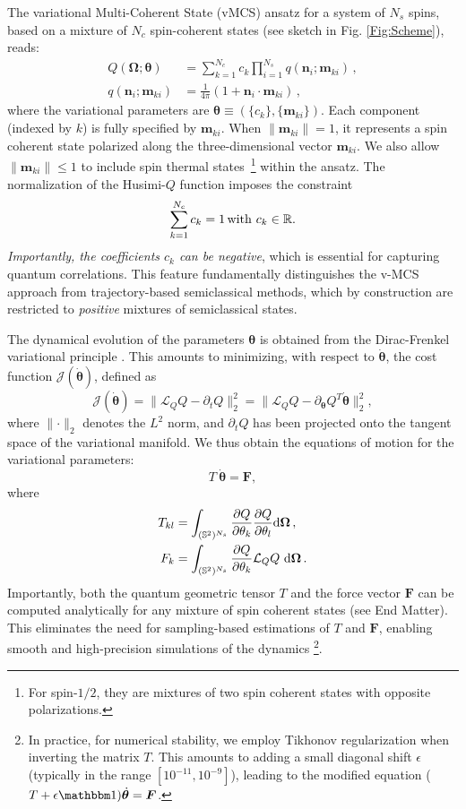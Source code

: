 \documentclass[aps,prl,twocolumn,superscriptaddress,english,floatfix]{revtex4-2}
\newcommand{\vect}[1]{\boldsymbol{#1}}
\renewcommand{\vec}[1]{\vect{#1}}
\renewcommand{\d}{{\rm {d}}}
\newcommand{\Omegavec}{\vec{\Omega}}
\newcommand{\thetavec}{{\vec{\theta}}}
\newcommand{\Fvec}{\vec{F}}
\newcommand{\mvec}{\vec{m}}
\newcommand{\nvec}{{\vec{n}}}
\newcommand{\bea}{\begin{equation}\begin{aligned}}
\newcommand{\eea}{\end{aligned}\end{equation}}
\begin{document}
The variational Multi-Coherent State (vMCS) ansatz for a system of $N_s$ spins, based on a mixture of $N_c$ spin-coherent states (see sketch in Fig. \ref{Fig:Scheme}), reads:
\bea\label{eq:vcms}
    Q(\Omegavec;\thetavec) &= \sum_{k=1}^{N_c} c_k\prod_{i = 1}^{N_s} q(\nvec_i;\mvec_{ki})\,,\\
    q(\nvec_i;\mvec_{ki})&= \frac{1}{4 \pi} (1 + {\nvec}_i \cdot {\mvec}_{ki})\,,
\eea
where the variational parameters are $\thetavec \equiv (\{c_k\}, \{\boldsymbol m_{ki}\})$. 
Each component (indexed by $k$) is fully specified by $\mvec_{ki}$. When $\lVert \mvec_{ki}\rVert = 1$, it represents a spin coherent state polarized along the three-dimensional vector $\mvec_{ki}$. We also allow $\lVert \mvec_{ki}\rVert\leq 1$ to include spin thermal states~\footnote{For spin-$1/2$, they are mixtures of two spin coherent states with opposite polarizations.} within the ansatz.
The normalization of the Husimi-$Q$ function imposes the constraint
\begin{equation}
    \sum_{k=1}^{N_c}c_k = 1 \, {\rm with} \, \, c_k \in \mathbb{R}.
\end{equation}
{\it Importantly, the coefficients $c_k$ can be negative}, which is essential for capturing quantum correlations. This feature fundamentally distinguishes the v-MCS approach from trajectory-based semiclassical methods, which by construction are restricted to \textit{positive} mixtures of semiclassical states.

The dynamical evolution of the parameters $\thetavec$ is obtained from the Dirac-Frenkel variational principle \cite{Lasser2022}. 
This amounts to minimizing, with respect to ${\dot \thetavec}$, the cost function $\mathcal J({\dot \thetavec})$, defined as
\begin{equation}
    \mathcal J(\dot \thetavec) = \lVert\mathcal L_Q Q - \partial_t Q \rVert_2^2 = \lVert\mathcal L_Q Q - \partial_\thetavec Q^T \dot \thetavec \rVert_2^2, 
\end{equation}
where $\lVert \cdot\rVert_2$ denotes the $L^2$ norm, and $\partial_t Q$ has been projected onto the tangent space of the variational manifold. We thus obtain the equations of motion for the variational parameters:
\begin{equation}
     T~{\dot \thetavec} = \Fvec,
\end{equation}
where 
\bea\label{eq:S-F}
T_{kl} &= \int_{(\mathbb{S}^2)^{N_s}} \frac{\partial Q}{\partial{\theta_k}} \frac{\partial Q}{\partial{\theta_l}} \d\Omegavec\,,\\
    F_k &= \int_{(\mathbb{S}^2)^{N_s}} \frac{\partial Q}{\partial \theta_k}  \mathcal L_Q Q ~\d\Omegavec\,. 
\eea
Importantly, both the quantum geometric tensor $T$ and the force vector $\Fvec$ can be computed analytically for any mixture of spin coherent states (see End Matter). 
This eliminates the need for sampling-based estimations of $T$ and $\Fvec$, enabling smooth and high-precision simulations of the dynamics \footnote{In practice, for numerical stability, we employ Tikhonov regularization when inverting the matrix $T$. This amounts to adding a small diagonal shift $\epsilon$ (typically in the range $[10^{-11},10^{-9}]$), leading to the modified equation ($T + \epsilon \mathbbm 1)\dot \thetavec = \boldsymbol F$.}.
\end{document}
